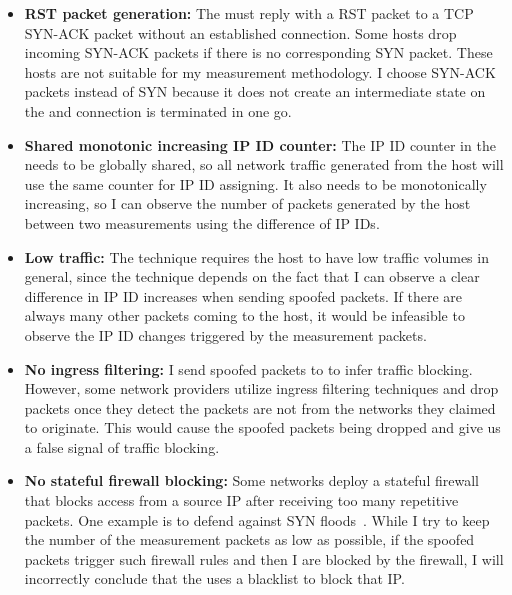\begin{itemize}
    \item \textbf{RST packet generation:}
    The {} must reply with a RST packet to a TCP SYN-ACK packet 
    without an established connection. Some hosts drop incoming SYN-ACK 
    packets if there is no corresponding SYN packet. These hosts are not
    suitable for my measurement methodology. I choose SYN-ACK packets 
    instead of SYN because it does not create an intermediate state on the
    {} and connection is terminated in one go.

    \item \textbf{Shared monotonic increasing IP ID counter:}
    The IP ID counter in the {} needs to be globally shared, so all
    network traffic generated from the host will use the same counter for IP
    ID assigning. It also needs to be monotonically increasing, so I can
    observe the number of packets generated by the host between two
    measurements using the difference of IP IDs.
    
    \item \textbf{Low traffic:}
    The technique requires the host to have low traffic volumes
    in general, since the technique depends on the fact
    that I can observe a clear difference in IP ID increases when sending
    spoofed packets. If there are always many other
    packets coming to the host, it would be infeasible to observe the IP ID
    changes triggered by the measurement packets.

    \item \textbf{No ingress filtering:}
    I send spoofed packets to {} to infer traffic blocking.
    However, some network providers utilize ingress filtering techniques and
    drop packets once they detect the packets are not from the networks they
    claimed to originate. This would cause the spoofed packets being dropped
    and give us a false signal of traffic blocking.

    \item \textbf{No stateful firewall blocking:}
    Some networks deploy a stateful firewall that blocks access from a source
    IP after receiving too many repetitive packets. One example is to defend
    against SYN floods~\cite{lemon2002resisting}. While I try to keep the
    number of the measurement packets as low as possible, if the spoofed
    packets trigger such firewall rules and then I are blocked by the 
    firewall, I will incorrectly conclude that the {} uses a
    blacklist to block that IP.
\end{itemize}

